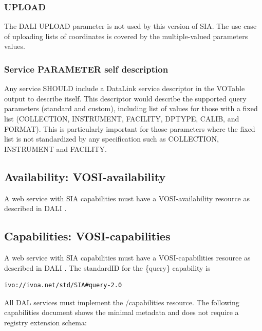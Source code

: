 \documentclass[11pt,a4paper]{ivoa}
\begin{document}
\subsubsection{UPLOAD}
 The DALI UPLOAD parameter is not used by this version of SIA. The use case of uploading lists of coordinates is covered by the multiple-valued parameters values.

\subsubsection{Service PARAMETER self description}
\label{sec:selfdesc}
Any service SHOULD  include a DataLink service descriptor in the VOTable output to describe itself. 
This descriptor would describe the supported query parameters (standard and custom), including list 
of values for those with a fixed list (COLLECTION, INSTRUMENT, FACILITY, DPTYPE, CALIB, and FORMAT).
This is particularly important for those parameters where the fixed list is not standardized by any
specification such as COLLECTION, INSTRUMENT and FACILITY.

\subsection{Availability: VOSI-availability}
A web service with SIA capabilities must have a VOSI-availability resource \citep{std:VOSI}  as described in DALI .
\subsection{Capabilities: VOSI-capabilities}
A web service with SIA capabilities must have a VOSI-capabilities resource \citep{std:VOSI} as described in DALI . The standardID for the \{query\} capability is 

\begin{lstlisting}
ivo://ivoa.net/std/SIA#query-2.0
\end{lstlisting}

All DAL services must implement the /capabilities resource. The following capabilities document shows the minimal metadata and does not require a registry extension schema:
\end{document}
